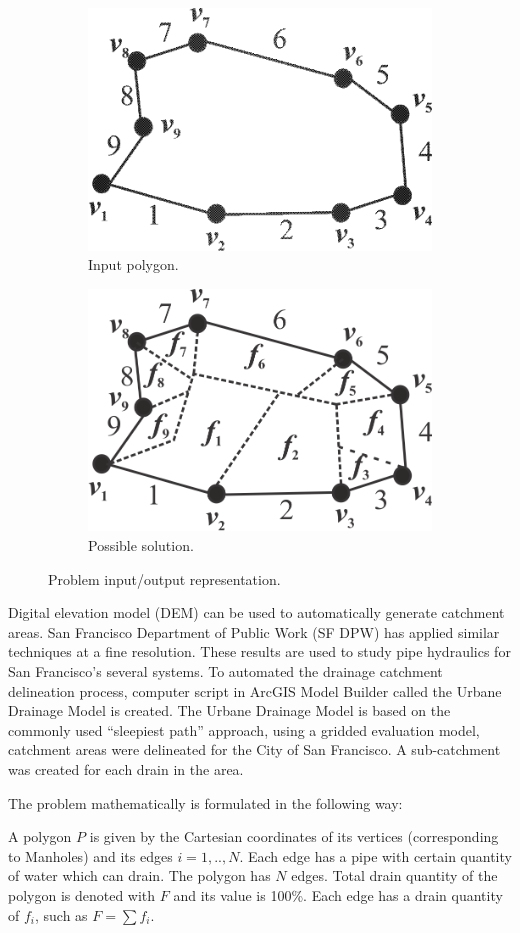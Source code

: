\documentclass[11pt,leqno]{book}
\begin{document}
\begin{figure}[h!]
\centering
\begin{subfigure}{.5\textwidth}
  \centering
  \includegraphics[width=.5\linewidth]{pic01.png}
  \caption{Input polygon.}
  \label{fig:sub1}
\end{subfigure}%
\begin{subfigure}{.5\textwidth}
  \centering
  \includegraphics[width=.5\linewidth]{pic03.png}
  \caption{Possible solution.}
  \label{fig:sub2}
\end{subfigure}
\caption{Problem input/output representation.}
\label{fig:one}
\end{figure}
\FloatBarrier

Digital elevation model (DEM) can be used to automatically generate catchment areas. San Francisco Department of Public Work (SF DPW) has applied similar techniques at a fine resolution.  These results are used to study pipe hydraulics for San Francisco’s several systems. To automated the drainage catchment delineation process,  computer script in ArcGIS Model Builder called the Urbane Drainage Model is created. The Urbane Drainage Model is based on the commonly used “sleepiest path” approach,  using a gridded evaluation model, catchment areas were delineated for the City of San Francisco. A sub-catchment was created for each drain in the area.

The problem  mathematically is formulated in the following way:

A polygon $P$ is given by the Cartesian coordinates of its vertices (corresponding to Manholes) and its edges $i=1,..,N$. Each edge has a pipe with certain quantity of water which can drain. The polygon has $N$ edges. Total drain quantity of the polygon is denoted with $F$ and its value is 100\%. Each edge has a drain quantity of $f_i$, such as  $F = \sum f_i$.
\end{document}
